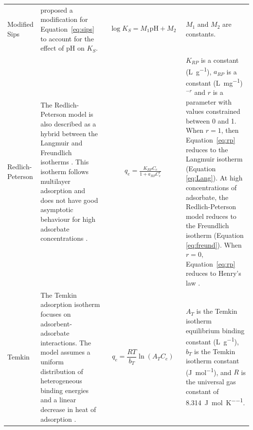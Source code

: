 \begin{landscape}
\begin{footnotesize}
\begin{longtable}{>{\raggedright\arraybackslash}p{2cm}p{7.25cm}p{4.5cm}p{7.25cm}}
			Modified Sips 
			
			& \textcite{Jeppu2012} proposed a modification for Equation~\ref{eq:sips} to account for the effect of pH on $ K_S $.
			
			&\begin{align}
			\log  K_{S} = M_1 \text{pH} + M_2
			\end{align}
			
			& $ M_1 $ and $ M_2 $ are constants. \\
			
			Redlich-Peterson
			
			& The Redlich-Peterson model is also described as a hybrid between the Langmuir and Freundlich isotherms \parencite{Ayawei2017}. This isotherm follows multilayer adsorption \parencite{Chan2012} and does not have good asymptotic behaviour for high adsorbate concentrations \parencite{Brouers2015}. 
			
			& \begin{align}
			q_e = \frac{K_{RP} C_e}{1 + a_{RP} C_e^r} \label{eq:rp}
			\end{align}
			
			&  $ K_{RP} $ is  a constant (\si{\liter\per\gram}), $ a_{RP} $ is a constant (\si{\liter\per\milli\gram})$^{-r}$ and $ r $ is a parameter with values constrained between 0 and 1. When $ r =1$, then Equation~\ref{eq:rp} reduces to the Langmuir isotherm (Equation \ref{eq:Lang}). At high concentrations of adsorbate, the Redlich-Peterson model reduces to the Freundlich isotherm (Equation \ref{eq:freund}). When $ r = 0 $, Equation~\ref{eq:rp} reduces to Henry's law \parencite{Ayawei2017}. \\
			
			Temkin
			
			& The Temkin adsorption isotherm focuses on adsorbent-adsorbate interactions. The model assumes a uniform distribution of heterogeneous binding energies and a linear decrease in heat of adsorption \parencite{Dada2012}.
			
			& \begin{equation}
			q_e = \frac{RT}{b_T} \ln \left(A_T C_e \right)
			\end{equation}
			
			& $ A_T $ is the Temkin isotherm equilibrium binding constant (\si{\liter\per\gram}), $ b_T $ is the Temkin isotherm constant (\si{\joule\per\mole}), and $ R $ is the universal gas constant of \SI{8.314}{\joule\per\mole\per\kelvin}. \\
			

\end{longtable}
\end{footnotesize}
\end{landscape}
